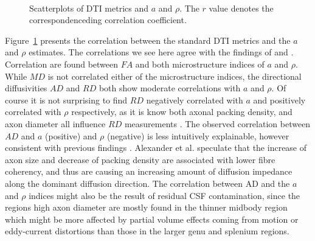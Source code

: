 \begin{figure}[ht]
{\begin{minipage}{0.5\textwidth}
					\begin{adjustbox}{width={\textwidth},totalheight=\textheight,keepaspectratio}
						\strut
						
					\end{adjustbox}\\
					\begin{adjustbox}{width={\textwidth},totalheight=\textheight,keepaspectratio}
						\strut
						
					\end{adjustbox}
					\end{minipage}
				}		
	\caption{Scatterplots of DTI metrics and $a$ and $\rho$. The $r$ value denotes the correspondenceding correlation coefficient.}
	\label{fig:chap 9 DTI correlations}	
\end{figure}	
Figure~\ref{fig:chap 9 DTI correlations} presents the correlation between the standard DTI metrics and the $a$ and $\rho$ estimates. The correlations we see here agree with the findings of \citep{Barazany:2009} and \citep{Alexander:2010}. Correlation are found between $FA$ and both microstructure indices of $a$ and $\rho$. While $MD$ is not correlated either of the microstructure indices, the directional diffusivities $AD$ and $RD$ both show moderate correlations with $a$ and $\rho$. Of course it is not surprising to find $RD$ negatively correlated with $a$ and positively correlated with $\rho$ respectively, as it is know both axonal packing density, and axon diameter all influence $RD$ measurements \citep{Beaulieu:2002}. The observed correlation between $AD$ and $a$ (positive) and $\rho$ (negative) is less intuitively explainable, however consistent with previous findings \citep{Barazany:2009,Alexander:2010}. Alexander et al. speculate that the increase of axon size and decrease of packing density are associated with lower fibre coherency, and thus are causing an increasing amount of diffusion impedance along the dominant diffusion direction. The correlation between AD and the $a$ and $\rho$ indices might also be the result of residual CSF contamination, since the regions high axon diameter are mostly found in the thinner midbody region which might be more affected by partial volume effects coming from motion or eddy-current distortions than those in the larger genu and splenium regions. 
\egroup %
\FloatBarrier

